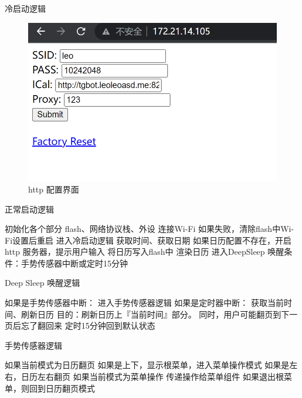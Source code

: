 \documentclass{ctexbeamer}
\begin{document}
\begin{frame}{冷启动逻辑}
    \begin{figure}[htp]
      \centering
      \includegraphics[width=.8\linewidth]{image7.png}
      \caption{http 配置界面}
    \end{figure}
\end{frame}
\begin{frame}{正常启动逻辑}
    \begin{outline}[enumerate]
        \1 初始化各个部分
            \2 flash、网络协议栈、外设
        \1 连接Wi-Fi
            \2 如果失败，清除flash中Wi-Fi设置后重启
            \2 进入冷启动逻辑
        \1 获取时间、获取日期
            \2 如果日历配置不存在，开启http 服务器，提示用户输入
        \1 将日历写入flash中
        \1 渲染日历
        \1 进入DeepSleep
            \2 唤醒条件：手势传感器中断或定时15分钟
    \end{outline}
\end{frame}
\begin{frame}{Deep Sleep 唤醒逻辑}
    \begin{outline}[enumerate]
        \1 如果是手势传感器中断：
            \2 进入手势传感器逻辑
        \1 如果是定时器中断：  
            \2 获取当前时间、刷新日历
            \2 目的：刷新日历上『当前时间』部分。
            \2 同时，用户可能翻页到下一页后忘了翻回来
                \3 定时15分钟回到默认状态
    \end{outline}
\end{frame}
\begin{frame}{手势传感器逻辑}
    \begin{outline}
        \1 如果当前模式为日历翻页
            \2 如果是上下，显示根菜单，进入菜单操作模式
            \2 如果是左右，日历左右翻页
        \1 如果当前模式为菜单操作
            \2 传递操作给菜单组件
            \2 如果退出根菜单，则回到日历翻页模式
    \end{outline}
\end{frame}
\end{document}
